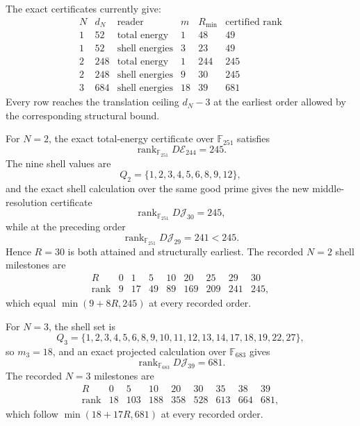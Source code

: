 \documentclass[10pt,leqno,twoside]{article}
\newcommand{\F}{\mathbb F}
\theoremstyle{plain}
\theoremstyle{remark}
\begin{document}
The exact certificates currently give:
\begin{equation}
\begin{array}{c|r|c|r|r|r}
N&d_N&\text{reader}&m& R_{\min}&\text{certified rank}\\ \hline
1&52&\text{total energy}&1&48&49\\
1&52&\text{shell energies}&3&23&49\\
2&248&\text{total energy}&1&244&245\\
2&248&\text{shell energies}&9&30&245\\
3&684&\text{shell energies}&18&39&681
\end{array}
\end{equation}
Every row reaches the translation ceiling $d_N-3$ at the earliest order allowed by the
corresponding structural bound.

For $N=2$, the exact total-energy certificate over $\F_{251}$ satisfies
\begin{equation}
\boxed{\operatorname{rank}_{\F_{251}}D\mathcal E_{244}=245.}
\end{equation}
The nine shell values are
\begin{equation}
Q_2=\{1,2,3,4,5,6,8,9,12\},
\end{equation}
and the exact shell calculation over the same good prime gives the new middle-resolution
certificate
\begin{equation}
\boxed{\operatorname{rank}_{\F_{251}}D\mathcal J_{30}=245,}
\end{equation}
while at the preceding order
\begin{equation}
\boxed{\operatorname{rank}_{\F_{251}}D\mathcal J_{29}=241<245.}
\end{equation}
Hence $R=30$ is both attained and structurally earliest.  The recorded $N=2$ shell milestones
are
\begin{equation}
\begin{array}{c|rrrrrrrr}
R&0&1&5&10&20&25&29&30\\ \hline
\operatorname{rank}&9&17&49&89&169&209&241&245,
\end{array}
\end{equation}
which equal $\min(9+8R,245)$ at every recorded order.

For $N=3$, the shell set is
\begin{equation}
Q_3=\{1,2,3,4,5,6,8,9,10,11,12,13,14,17,18,19,22,27\},
\end{equation}
so $m_3=18$, and an exact projected calculation over $\F_{683}$ gives
\begin{equation}
\boxed{\operatorname{rank}_{\F_{683}}D\mathcal J_{39}=681.}
\end{equation}
The recorded $N=3$ milestones are
\begin{equation}
\begin{array}{c|rrrrrrrr}
R&0&5&10&20&30&35&38&39\\ \hline
\operatorname{rank}&18&103&188&358&528&613&664&681,
\end{array}
\end{equation}
which follow $\min(18+17R,681)$ at every recorded order.
\end{document}
